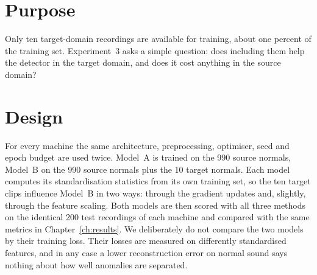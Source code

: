 \section{Purpose}
Only ten target-domain recordings are available for training, about one percent of the training set. Experiment~3 asks a simple question: does including them help the detector in the target domain, and does it cost anything in the source domain?

\section{Design}
For every machine the same architecture, preprocessing, optimiser, seed and epoch budget are used twice. Model~A is trained on the 990 source normals, Model~B on the 990 source normals plus the 10 target normals. Each model computes its standardisation statistics from its own training set, so the ten target clips influence Model~B in two ways: through the gradient updates and, slightly, through the feature scaling. Both models are then scored with all three methods on the identical 200 test recordings of each machine and compared with the same metrics in Chapter~\ref{ch:results}. We deliberately do not compare the two models by their training loss. Their losses are measured on differently standardised features, and in any case a lower reconstruction error on normal sound says nothing about how well anomalies are separated.

